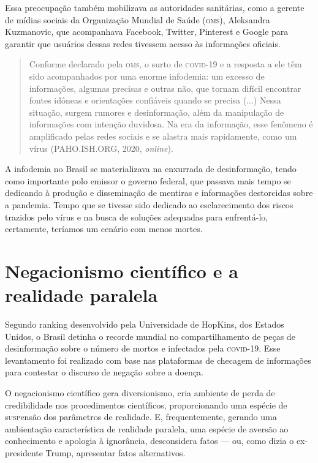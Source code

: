 Essa preocupação também mobilizava as autoridades sanitárias, como a
gerente de mídias sociais da Organização Mundial de Saúde (\textsc{oms}),
Aleksandra Kuzmanovic, que acompanhava Facebook, Twitter, Pinterest e
Google para garantir que usuários dessas redes tivessem acesso às
informações oficiais.

\begin{quote}
Conforme declarado pela \textsc{oms}, o surto de \textsc{covid-19} e a resposta a ele têm
sido acompanhados por uma enorme infodemia: um excesso de informações,
algumas precisas e outras não, que tornam difícil encontrar fontes
idôneas e orientações confiáveis quando se precisa (...) Nessa situação,
surgem rumores e desinformação, além da manipulação de informações com
intenção duvidosa. Na era da informação, esse fenômeno é amplificado
pelas redes sociais e se alastra mais rapidamente, como um vírus
(PAHO.ISH.ORG, 2020, \textit{online}).
\end{quote}

A infodemia no Brasil se materializava na enxurrada de desinformação,
tendo como importante polo emissor o governo federal, que passava mais
tempo se dedicando à produção e disseminação de mentiras e informações
destorcidas sobre a pandemia. Tempo que se tivesse sido dedicado ao
esclarecimento dos riscos trazidos pelo vírus e na busca de soluções
adequadas para enfrentá-lo, certamente, teríamos um cenário com menos
mortes.

\section{Negacionismo científico e a realidade paralela}

Segundo ranking desenvolvido pela Universidade de HopKins, dos Estados
Unidos, o Brasil detinha o recorde mundial no compartilhamento de peças
de desinformação sobre o número de mortos e infectados pela \textsc{covid-19}.
Esse levantamento foi realizado com base nas plataformas de checagem de
informações para contestar o discurso de negação sobre a doença.

O negacionismo científico gera diversionismo, cria ambiente de perda de
credibilidade nos procedimentos científicos, proporcionando uma espécie
de s\textsc{usp}ensão dos parâmetros de realidade. E, frequentemente, gerando uma
ambientação característica de realidade paralela, uma espécie de aversão
ao conhecimento e apologia à ignorância, desconsidera fatos --- ou, como
dizia o ex-presidente Trump, apresentar fatos alternativos.

